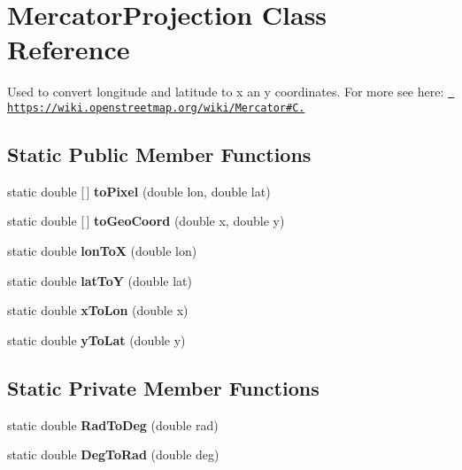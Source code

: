 \hypertarget{class_mercator_projection}{}\section{Mercator\+Projection Class Reference}
\label{class_mercator_projection}


Used to convert longitude and latitude to x an y coordinates. For more see here\+: \href{https://wiki.openstreetmap.org/wiki/Mercator\#C.23}{\texttt{ https\+://wiki.\+openstreetmap.\+org/wiki/\+Mercator\#\+C.}}  


\subsection*{Static Public Member Functions}
\begin{DoxyCompactItemize}
\item 
\mbox{\label{class_mercator_projection_aa0d983984c933089ab2ecd2c311e5705}} 
static double \mbox{[}$\,$\mbox{]} {\bfseries to\+Pixel} (double lon, double lat)
\item 
\mbox{\label{class_mercator_projection_a46056d2161792e5607bd4e81595addcc}} 
static double \mbox{[}$\,$\mbox{]} {\bfseries to\+Geo\+Coord} (double x, double y)
\item 
\mbox{\label{class_mercator_projection_ab08db85ca345829917613a5aa4fef18b}} 
static double {\bfseries lon\+ToX} (double lon)
\item 
\mbox{\label{class_mercator_projection_a01d3863738c0708df73a0e954f83944a}} 
static double {\bfseries lat\+ToY} (double lat)
\item 
\mbox{\label{class_mercator_projection_ad9b69ce79101c0a642421f1659e7acfb}} 
static double {\bfseries x\+To\+Lon} (double x)
\item 
\mbox{\label{class_mercator_projection_aed6ac45adb3e4b97c29569c344f19424}} 
static double {\bfseries y\+To\+Lat} (double y)
\end{DoxyCompactItemize}
\subsection*{Static Private Member Functions}
\begin{DoxyCompactItemize}
\item 
\mbox{\label{class_mercator_projection_a01e3698fcf9d66ec04dcbea8a3aec6d9}} 
static double {\bfseries Rad\+To\+Deg} (double rad)
\item 
\mbox{\label{class_mercator_projection_a436471e275b62ddec88e2697539ee40d}} 
static double {\bfseries Deg\+To\+Rad} (double deg)
\end{DoxyCompactItemize}
